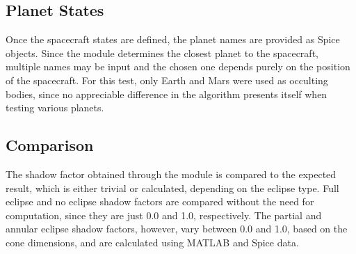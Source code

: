 \subsection{Planet States}
Once the spacecraft states are defined, the planet names are provided as Spice objects. Since the module determines the closest planet to the spacecraft, multiple names may be input and the chosen one depends purely on the position of the spacecraft. For this test, only Earth and Mars were used as occulting bodies, since no appreciable difference in the algorithm presents itself when testing various planets.
\subsection{Comparison}
The shadow factor obtained through the module is compared to the expected result, which is either trivial or calculated, depending on the eclipse type. Full eclipse and no eclipse shadow factors are compared without the need for computation, since they are just 0.0 and 1.0, respectively. The partial and annular eclipse shadow factors, however, vary between 0.0 and 1.0, based on the cone dimensions, and are calculated using MATLAB and Spice data.

